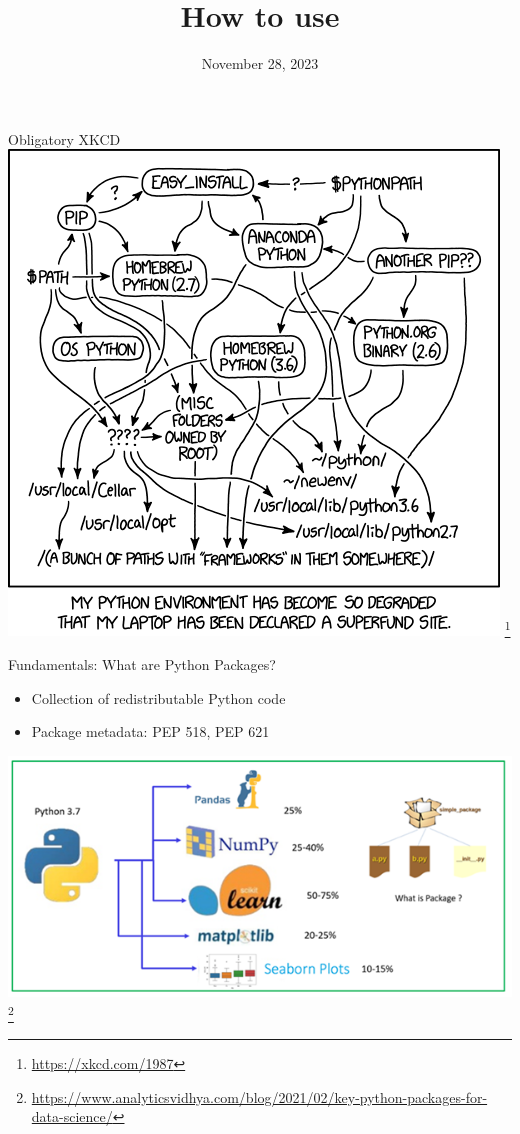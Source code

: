 \documentclass[aspectratio=169]{beamer}
\title{How to use \ttfamily{poetry}}
\institute{Engineers for Exploration, UC San Diego}
\date{November 28, 2023}
\begin{document}
\maketitle
\begin{frame}{Obligatory XKCD}
    \centering
    \includegraphics[width=\textwidth,height=0.8\textheight,keepaspectratio]{xkcd_1987_python_environment.png} \footnote{\url{https://xkcd.com/1987}}
\end{frame}
\begin{frame}{Fundamentals: What are Python Packages?}
    \begin{itemize}
        \item Collection of redistributable Python code
        \item Package metadata: PEP 518, PEP 621
    \end{itemize}
    \centering
    \includegraphics[width=\textwidth,height=0.6\textheight,keepaspectratio]{python_packages.png} \footnote{\url{https://www.analyticsvidhya.com/blog/2021/02/key-python-packages-for-data-science/}}
\end{frame}
\end{document}
